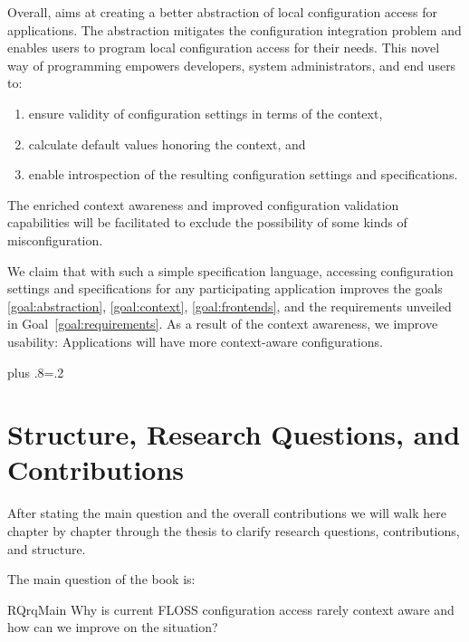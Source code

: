 Overall, \elektra{} aims at creating a better abstraction of local configuration access for applications.
The abstraction mitigates the configuration integration problem and enables users to program local configuration access for their needs.
This novel way of programming empowers developers, system administrators, and end users to:
\begin{enumerate}
 \item ensure validity of configuration settings in terms of the context,
 \item calculate default values honoring the context, and
 \item enable introspection of the resulting configuration settings and specifications.
\end{enumerate}
The enriched context awareness and improved configuration validation capabilities will be facilitated to exclude the possibility of some kinds of misconfiguration.

We claim that with such a simple specification language, accessing configuration settings and specifications for any participating application improves the goals \ref{goal:abstraction}, \ref{goal:context}, \ref{goal:frontends}, and the requirements unveiled in Goal~\ref{goal:requirements}.
As a result of the context awareness, we improve usability:
Applications will have more context-aware configurations.%
{\parfillskip=0pt plus .8\textwidth \emergencystretch=.2\textwidth \par}











\section{Structure, Research Questions, and Contributions}

After stating the main question and the overall contributions we will walk here chapter by chapter through the thesis to clarify research questions, contributions, and structure.

The main question of the book is:

\begin{restatable}{RQ}{rqMain}
Why is current FLOSS configuration access rarely context aware and how can we improve on the situation?%
\label{rq:main}
\end{restatable}


